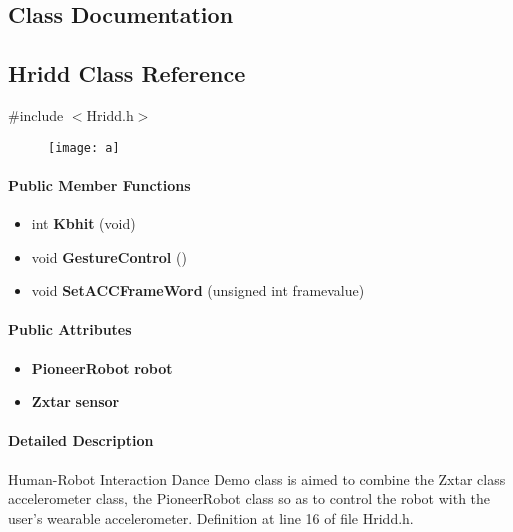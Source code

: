  \begin{appendices}

  \chapter{Class Documentation}
  
  \section{\-Hridd \-Class \-Reference}
\label{class_hridd}
{\ttfamily \#include $<$\-Hridd.\-h$>$}

\begin{figure}[H]
\begin{center}
\leavevmode
\texttt{[image: a]}
\end{center}
\end{figure}

\subsubsection*{\-Public \-Member \-Functions}
\begin{itemize}
\item 
int {\bf \-Kbhit} (void)
\item 
void {\bf \-Gesture\-Control} ()
\item 
void {\bf \-Set\-A\-C\-C\-Frame\-Word} (unsigned int framevalue)
\end{itemize}

\subsubsection*{\-Public \-Attributes}
\begin{itemize}
\item 
{\bf \-Pioneer\-Robot} {\bf robot}
\item 
{\bf \-Zxtar} {\bf sensor}
\end{itemize}


\subsubsection{\-Detailed \-Description}
 \-Human-\/\-Robot \-Interaction \-Dance \-Demo class is aimed to combine the 
\-Zxtar class accelerometer class,  the Pioneer\-Robot class so as to control the robot with the user's wearable accelerometer.
\-Definition at line 16 of file \-Hridd.\-h.






\end{appendices}
